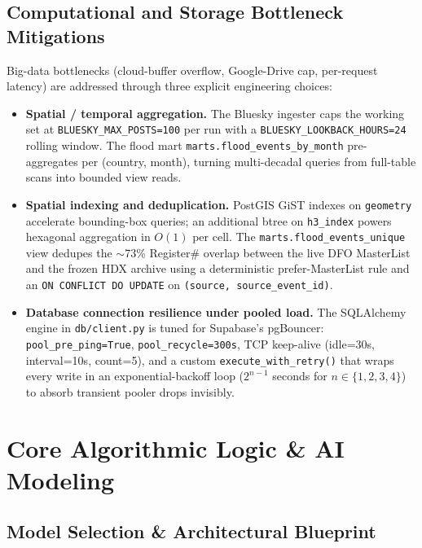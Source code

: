 \documentclass[11pt,a4paper]{article}
\begin{document}
\subsection{Computational and Storage Bottleneck Mitigations}

Big-data bottlenecks (cloud-buffer overflow, Google-Drive cap, per-request
latency) are addressed through three explicit engineering choices:

\begin{itemize}
    \item \textbf{Spatial / temporal aggregation.} The Bluesky ingester
    caps the working set at \texttt{BLUESKY\_MAX\_POSTS=100} per run with a
    \texttt{BLUESKY\_LOOKBACK\_HOURS=24} rolling window. The flood mart
    \texttt{marts.flood\_events\_by\_month} pre-aggregates per
    (country, month), turning multi-decadal queries from full-table scans
    into bounded view reads.

    \item \textbf{Spatial indexing and deduplication.} PostGIS GiST indexes
    on \texttt{geometry} accelerate bounding-box queries; an additional
    btree on \texttt{h3\_index} powers hexagonal aggregation in $O(1)$
    per cell. The \texttt{marts.flood\_events\_unique} view dedupes the
    $\sim$73\% Register\# overlap between the live DFO MasterList and the
    frozen HDX archive using a deterministic prefer-MasterList rule and
    an \texttt{ON CONFLICT DO UPDATE} on \texttt{(source,
    source\_event\_id)}.

    \item \textbf{Database connection resilience under pooled load.} The
    SQLAlchemy engine in \texttt{db/client.py} is tuned for Supabase's
    pgBouncer: \texttt{pool\_pre\_ping=True}, \texttt{pool\_recycle=300s},
    TCP keep-alive (idle=30s, interval=10s, count=5), and a custom
    \texttt{execute\_with\_retry()} that wraps every write in an
    exponential-backoff loop ($2^{n-1}$ seconds for $n \in \{1,2,3,4\}$)
    to absorb transient pooler drops invisibly.
\end{itemize}

\section{Core Algorithmic Logic \& AI Modeling}

\subsection{Model Selection \& Architectural Blueprint}
\end{document}
